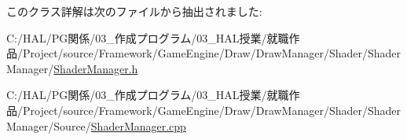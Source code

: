 このクラス詳解は次のファイルから抽出されました\+:\begin{DoxyCompactItemize}
\item 
C\+:/\+H\+A\+L/\+P\+G関係/03\+\_\+作成プログラム/03\+\_\+\+H\+A\+L授業/就職作品/\+Project/source/\+Framework/\+Game\+Engine/\+Draw/\+Draw\+Manager/\+Shader/\+Shader\+Manager/\mbox{\hyperlink{_shader_manager_8h}{Shader\+Manager.\+h}}\item 
C\+:/\+H\+A\+L/\+P\+G関係/03\+\_\+作成プログラム/03\+\_\+\+H\+A\+L授業/就職作品/\+Project/source/\+Framework/\+Game\+Engine/\+Draw/\+Draw\+Manager/\+Shader/\+Shader\+Manager/\+Source/\mbox{\hyperlink{_shader_manager_8cpp}{Shader\+Manager.\+cpp}}\end{DoxyCompactItemize}
